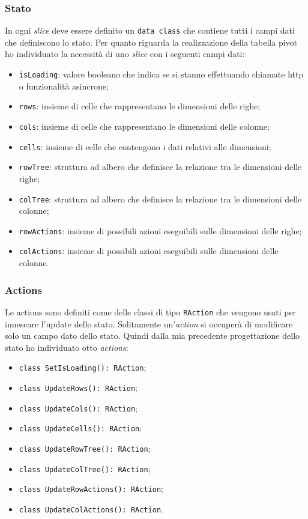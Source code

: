 \subsubsection*{Stato}
In ogni \emph{slice} deve essere definito un \verb|data class| che contiene tutti i campi dati che definiscono lo stato. Per quanto riguarda la realizzazione della tabella pivot ho individuato la necessità di uno \emph{slice} con i seguenti campi dati:
\begin{itemize}
	\item \verb|isLoading|: valore booleano che indica se si stanno effettuando chiamate http o funzionalità asincrone;
	\item \verb|rows|: insieme di celle che rappresentano le dimensioni delle righe;
	\item \verb|cols|: insieme di celle che rappresentano le dimensioni delle colonne;
	\item \verb|cells|: insieme di celle che contengono i dati relativi alle dimensioni;
	\item \verb|rowTree|: struttura ad albero che definisce la relazione tra le dimensioni delle righe;
	\item \verb|colTree|: struttura ad albero che definisce la relazione tra le dimensioni delle colonne;
	\item \verb|rowActions|: insieme di possibili azioni eseguibili sulle dimensioni delle righe;
	\item \verb|colActions|: insieme di possibili azioni eseguibili sulle dimensioni delle colonne.
\end{itemize}

\subsubsection*{Actions}
Le actions sono definiti come delle classi di tipo \verb|RAction| che vengono usati per innescare l'update dello stato. Solitamente un'\emph{action} si occuperà di modificare solo un campo dato dello stato. Quindi dalla mia precedente progettazione dello stato ho individuato otto \emph{actions}:
\begin{itemize}
	\item \verb|class SetIsLoading(): RAction|;
	\item \verb|class UpdateRows(): RAction|;
	\item \verb|class UpdateCols(): RAction|;
	\item \verb|class UpdateCells(): RAction|;
	\item \verb|class UpdateRowTree(): RAction|;
	\item \verb|class UpdateColTree(): RAction|;
	\item \verb|class UpdateRowActions(): RAction|;
	\item \verb|class UpdateColActions(): RAction|.
\end{itemize}

